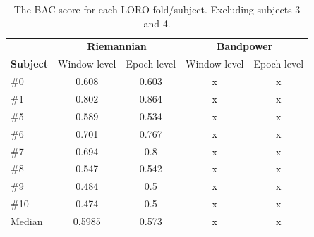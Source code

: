         \begin{table}[h]
            \centering
            \begin{tabular}{lcccc}
                \toprule
                & \multicolumn{2}{c}{\textbf{Riemannian}} & \multicolumn{2}{c}{\textbf{Bandpower}} \\
                \cmidrule(lr){2-3}
                \cmidrule(lr){4-5}
                \textbf{Subject} & Window-level & Epoch-level & Window-level & Epoch-level \\
                \midrule
                \#0  & 0.608  & 0.603 & x & x \\
                \#1  & 0.802  & 0.864 & x & x \\
                \#5  & 0.589  & 0.534 & x & x \\
                \#6  & 0.701  & 0.767 & x & x \\
                \#7  & 0.694  & 0.8   & x & x \\
                \#8  & 0.547  & 0.542 & x & x \\
                \#9  & 0.484  & 0.5   & x & x \\
                \#10 & 0.474  & 0.5   & x & x \\
                \midrule
                Median & 0.5985 & 0.573 & x & x \\
                \bottomrule
            \end{tabular}
            \caption{The BAC score for each LORO fold/subject. Excluding subjects 3 and 4.}\label{table:bac-all}
        \end{table}

